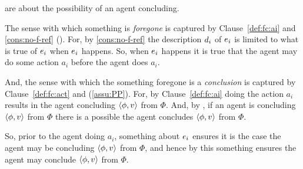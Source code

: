 \begin{note}
   are about the possibility of an agent concluding.

  The sense with which something is \emph{foregone} is captured by Clause~\ref{def:fc:ai} and \autoref{cons:no-f-ref} ().
  For, by \autoref{cons:no-f-ref} the description \(d\sb{i}\) of \(e\sb{i}\) is limited to what is true of \(e\sb{i}\) when \(e\sb{i}\) happens.
  So, when \(e\sb{i}\) happens it is true that the agent may do some action \(a_{i}\) before the agent does \(a_{i}\).

  And, the sense with which the something foregone is a \emph{conclusion} is captured by Clause~\ref{def:fc:act} and \assuPP{} (\autoref{assu:PP}).
  For, by Clause~\ref{def:fc:ai} doing the action \(a_{i}\) results in the agent concluding \(\langle\phi, v\rangle\) from \(\Phi\).
  And, by \assuPP{}, if an agent is concluding \(\langle\phi, v\rangle\) from \(\Phi\) there is a possible  the agent concludes \(\langle\phi, v\rangle\) from \(\Phi\).

  So, prior to the agent doing \(a_{i}\), something about \(e\sb{i}\) ensures it is the case the agent may be concluding \(\langle\phi, v\rangle\) from \(\Phi\), and hence by \assuPP{} this something ensures the agent may conclude \(\langle\phi, v\rangle\) from \(\Phi\).
\end{note}

